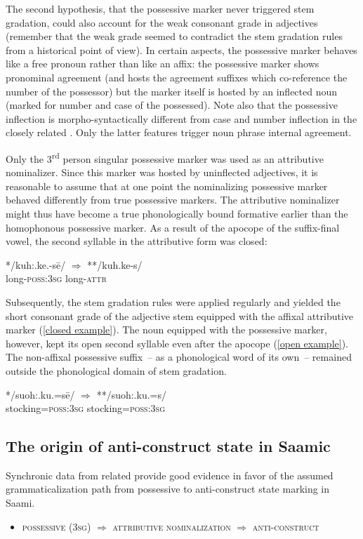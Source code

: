 {The second hypothesis, that the possessive marker never triggered stem gradation, could also account for the weak consonant grade in adjectives (remember that the weak grade seemed to contradict the stem gradation rules from a historical point of view). In certain aspects, the possessive marker behaves like a free pronoun rather than like an affix: the possessive marker shows pronominal agreement (and hosts the agreement suffixes which co-reference the number of the possessor) but the marker itself is hosted by an inflected noun (marked for number and case of the possessed). Note also that the possessive inflection is morpho-syntactically different from case and number inflection in the closely related . Only the latter features trigger noun phrase internal agreement.

Only the 3\textsuperscript{rd} person singular possessive marker was used as an attributive nominalizer. Since this marker was hosted by uninflected adjectives, it is reasonable to assume that at one point the nominalizing possessive marker behaved differently from true possessive markers. The attributive nominalizer might thus have become a true phonologically bound formative earlier than the homophonous possessive marker. As a result of the apocope of the suffix-final vowel, the second syllable in the attributive form was closed:
\begin{exe}
\ex
\label{closed example}
\gll	**/kuh:.ke.-sē/ $\Rightarrow$ **/kuh.ke-s/\\
	long-\textsc{poss:3sg} {} long-\textsc{attr}\\
\end{exe}

Subsequently, the stem gradation rules were applied regularly and yielded the short consonant grade of the adjective stem equipped with the affixal attributive marker (\ref{closed example}). The noun equipped with the possessive marker, however, kept its open second syllable even after the apocope (\ref{open example}). The non-affixal possessive suffix~– as a phonological word of its own~– remained outside the phonological domain of stem gradation.
\begin{exe}
\ex 
\label{open example}
\gll	**/suoh:.ku.=sē/ $\Rightarrow$ **/suoh:.ku.=s/\\
	stocking=\textsc{poss:3sg} {} stocking=\textsc{poss:3sg}\\
\end{exe}

\subsection{The origin of anti\hyp{}construct state in Saamic}
Synchronic data from related  provide good evidence in favor of the assumed grammaticalization path from possessive to anti\hyp{}construct state marking in Saami.
\begin{itemize}
\item \textsc{possessive} (\textsc{3sg}) $\Rightarrow$ \textsc{attributive nominalization} $\Rightarrow$ \textsc{anti}-\textsc{construct}
\end{itemize}

}
